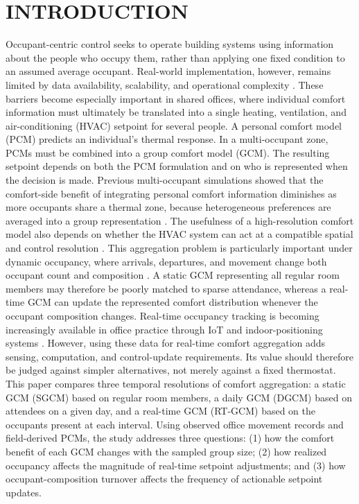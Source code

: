 \section{INTRODUCTION}

Occupant-centric control seeks to operate building systems using information about the people who occupy them, rather than applying one fixed condition to an assumed average occupant.
Real-world implementation, however, remains limited by data availability, scalability, and operational complexity \parencite{xie_review_2020,soleimanijavid_challenges_2024}.
These barriers become especially important in shared offices, where individual comfort information must ultimately be translated into a single heating, ventilation, and air-conditioning (HVAC) setpoint for several people.
A personal comfort model (PCM) predicts an individual's thermal response.
In a multi-occupant zone, PCMs must be combined into a group comfort model (GCM).
The resulting setpoint depends on both the PCM formulation and on who is represented when the decision is made.
Previous multi-occupant simulations showed that the comfort-side benefit of integrating personal comfort information diminishes as more occupants share a thermal zone, because heterogeneous preferences are averaged into a group representation \parencite{jung_energy_2020, wang_enhancing_2026}.
The usefulness of a high-resolution comfort model also depends on whether the HVAC system can act at a compatible spatial and control resolution \parencite{ono_effects_2022}.
This aggregation problem is particularly important under dynamic occupancy, where arrivals, departures, and movement change both occupant count and composition \parencite{marzban_review_2023}.
A static GCM representing all regular room members may therefore be poorly matched to sparse attendance, whereas a real-time GCM can update the represented comfort distribution whenever the occupant composition changes.
Real-time occupancy tracking is becoming increasingly available in office practice through IoT and indoor-positioning systems \parencite{zafari_survey_2019}.
However, using these data for real-time comfort aggregation adds sensing, computation, and control-update requirements.
Its value should therefore be judged against simpler alternatives, not merely against a fixed thermostat.
This paper compares three temporal resolutions of comfort aggregation: a static GCM (SGCM) based on regular room members, a daily GCM (DGCM) based on attendees on a given day, and a real-time GCM (RT-GCM) based on the occupants present at each interval.
Using observed office movement records and field-derived PCMs, the study addresses three questions: (1) how the comfort benefit of each GCM changes with the sampled group size; (2) how realized occupancy affects the magnitude of real-time setpoint adjustments; and (3) how occupant-composition turnover affects the frequency of actionable setpoint updates.